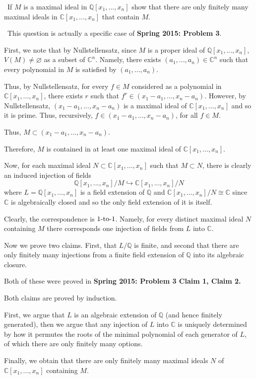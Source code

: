 \documentclass[12pt]{AlgebraQual}
\begin{document}
\begin{problem} $\,$
If $M$ is a maximal ideal in $\mathbb{Q}[x_1,...,x_n]$ show that there are only finitely many maximal ideals in $\mathbb{C}[x_1,...,x_n]$ that contain $M.$
\end{problem}


\begin{solution}$\,$
This question is actually a specific case of \textbf{Spring 2015: Problem 3}.

First, we note that by Nullstellensatz, since $M$ is a proper ideal of $\mathbb{Q}[x_1,...,x_n]$, $V(M)\not=\varnothing$ as a subset of $\mathbb{C}^n$. Namely, there exists $(a_1,...,a_n)\in\mathbb{C}^n$ such that every polynomial in $M$ is satisfied by $(a_1,...,a_n)$.

Thus, by Nullstellensatz, for every $f\in M$ considered as a polynomial in $\mathbb{C}[x_1,...,x_n]$, there exists $r$ such that $f^r\in (x_1-a_1,...,x_n-a_n)$. However, by Nullstellensatz, $(x_1-a_1,...,x_n-a_n)$
 is a maximal ideal of $\mathbb{C}[x_1,...,x_n]$ and so it is prime. Thus, recursively, $f\in (x_1-a_1,...,x_n-a_n)$, for all $f\in M$.

Thus, $M\subset (x_1-a_1,...,x_n-a_n).$

Therefore, $M$ is contained in at least one maximal ideal of $\mathbb{C}[x_1,...,x_n].$

Now, for each maximal ideal $N\subset\mathbb{C}[x_1,...,x_n]$ such that $M\subset N$, there is clearly an induced injection of fields $$\mathbb{Q}[x_1,...,x_n]/M\hookrightarrow\mathbb{C}[x_1,...,x_n]/N$$ where $L=\mathbb{Q}[x_1,...,x_n]$ is a field extension of $\mathbb{Q}$ and $\mathbb{C}[x_1,...,x_n]/N\cong \mathbb{C}$ since $\mathbb{C}$ is algebraically closed and so the only field extension of it is itself.

Clearly, the correspondence is $1\text{-to-}1$. Namely, for every distinct maximal ideal $N$ containing $M$ there corresponds one injection of fields from $L$ into $\mathbb{C}.$

Now we prove two claims. First, that $L/\mathbb{Q}$ is finite, and second that there are only finitely many injections from a finite field extension of $\mathbb{Q}$ into its algebraic closure.

Both of these were proved in \textbf{Spring 2015: Problem 3 Claim 1, Claim 2.}

Both claims are proved by induction.

First, we argue that $L$ is an algebraic extension of $\mathbb{Q}$ (and hence finitely generated), then we argue that any injection of $L$ into $\mathbb{C}$ is uniquely determined by how it permutes the roots of the minimal polynomial of each generator of $L$, of which there are only finitely many options.

Finally, we obtain that there are only finitely many maximal ideals $N$ of $\mathbb{C}[x_1,...,x_n]$ containing $M.$
\end{solution}
\newpage
\end{document}
